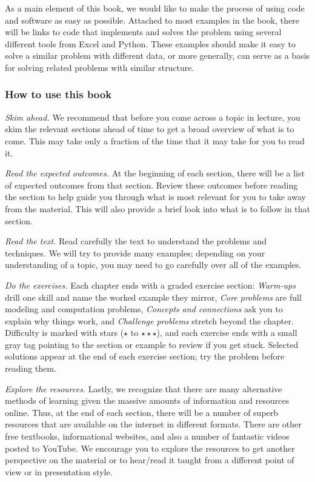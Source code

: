 As a main element of this book, we would like to make the process of using code and software as easy as possible.  Attached to most examples in the book, there will be links to code that implements and solves the problem using several different tools from Excel and Python.  These examples should make it easy to solve a similar problem with different data, or more generally, can serve as a basis for solving related problems with similar structure.

\subsubsection*{How to use this book}

\emph{Skim ahead.} We recommend that before you come across a topic in lecture, you skim the relevant sections ahead of time to get a broad overview of what is to come.   This may take only a fraction of the time that it may take for you to read it.

\emph{Read the expected outcomes.} At the beginning of each section, there will be a list of expected outcomes from that section.  Review these outcomes before reading the section to help guide you through what is most relevant for you to take away from the material.  This will also provide a brief look into what is to follow in that section.

\emph{Read the text.} Read carefully the text to understand the problems and techniques.  We will try to provide many examples; depending on your understanding of a topic, you may need to go carefully over all of the examples.

\emph{Do the exercises.} Each chapter ends with a graded exercise section: \emph{Warm-ups} drill one skill and name the worked example they mirror, \emph{Core problems} are full modeling and computation problems, \emph{Concepts and connections} ask you to explain why things work, and \emph{Challenge problems} stretch beyond the chapter. Difficulty is marked with stars ($\star$ to $\star\star\star$), and each exercise ends with a small gray tag pointing to the section or example to review if you get stuck. Selected solutions appear at the end of each exercise section; try the problem before reading them.

\emph{Explore the resources.} Lastly, we recognize that there are many alternative methods of learning given the massive amounts of information and resources online.   Thus, at the end of each section, there will be a number of superb resources that are available on the internet in different formats.   There are other free textbooks, informational websites, and also a number of fantastic videos posted to YouTube.  We encourage you to explore the resources to get another perspective on the material or to hear/read it taught from a different point of view or in presentation style.  

